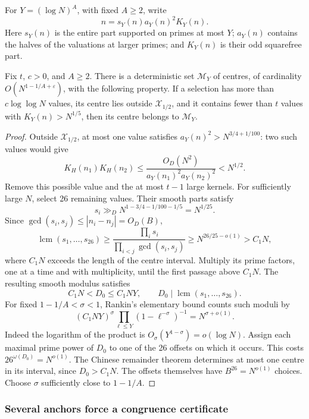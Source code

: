 For \(Y=(\log N)^A\), with fixed \(A\ge2\), write
\[
 n=s_Y(n)a_Y(n)^2K_Y(n).
\]
Here \(s_Y(n)\) is the entire part supported on primes at most
\(Y\); \(a_Y(n)\) contains the halves of the valuations at
larger primes; and \(K_Y(n)\) is their odd squarefree part.

\begin{lemma}
\label{p13:half:smooth}
Fix \(t\), \(c>0\), and \(A\ge2\).
There is a deterministic set \(\mathcal M_Y\) of centres,
of cardinality \(O(N^{1-1/A+\varepsilon})\), with the
following property. If a selection has more than
\(c\log\log N\) values, its centre lies outside
\(\mathcal X_{1/2}\), and it contains fewer than \(t\)
values with \(K_Y(n)>N^{1/5}\), then its centre belongs
to \(\mathcal M_Y\).
\end{lemma}

\begin{proof}
Outside \(\mathcal X_{1/2}\), at most one value satisfies
\(a_Y(n)^2>N^{3/4+1/100}\): two such values would give
\[
 K_H(n_1)K_H(n_2)
 \le\frac{O_D(N^2)}{a_Y(n_1)^2a_Y(n_2)^2}<N^{1/2}.
\]
Remove this possible value and the at most \(t-1\)
large kernels. For sufficiently large \(N\), select
26 remaining values. Their smooth parts satisfy
\[
 s_i\gg_D N^{1-3/4-1/100-1/5}=N^{1/25}.
\]
Since \(\gcd(s_i,s_j)\le |n_i-n_j|=O_D(B)\),
\[
 \operatorname{lcm}(s_1,\ldots,s_{26})
 \ge\frac{\prod_i s_i}{\prod_{i<j}\gcd(s_i,s_j)}
 \ge N^{26/25-o(1)}>C_1N,
\]
where \(C_1N\) exceeds the length of the centre interval.
Multiply its prime factors, one at a time and with
multiplicity, until the first passage above \(C_1N\).
The resulting smooth modulus satisfies
\[
 C_1N<D_0\le C_1NY,\qquad
 D_0\mid\operatorname{lcm}(s_1,\ldots,s_{26}).
\]
For fixed \(1-1/A<\sigma<1\), Rankin's elementary bound
counts such moduli by
\[
 (C_1NY)^\sigma
       \prod_{\ell\le Y}(1-\ell^{-\sigma})^{-1}
 =N^{\sigma+o(1)}.
\]
Indeed the logarithm of the product is
\(O_\sigma(Y^{1-\sigma})=o(\log N)\).
Assign each maximal prime power of \(D_0\) to one of the
26 offsets on which it occurs. This costs
\(26^{\omega(D_0)}=N^{o(1)}\).
The Chinese remainder theorem determines at most one centre
in its interval, since \(D_0>C_1N\). The offsets themselves
have \(B^{26}=N^{o(1)}\) choices.
Choose \(\sigma\) sufficiently close to \(1-1/A\).
\end{proof}

\subsubsection{Several anchors force a congruence certificate}

